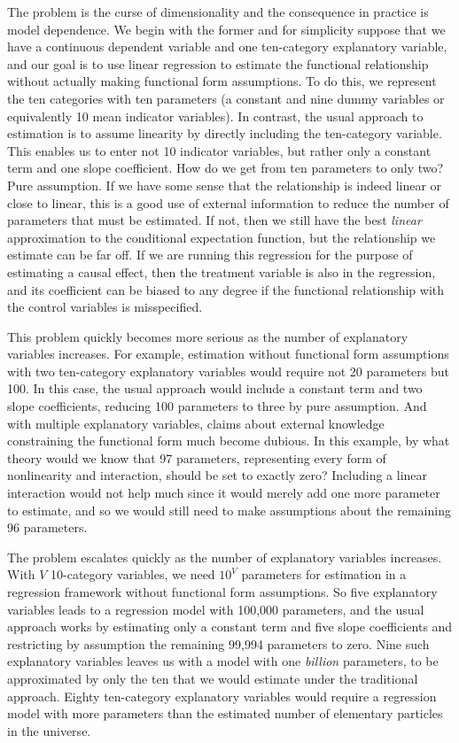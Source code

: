 \documentclass[11pt,titlepage]{article}
\begin{document}
The problem is the curse of dimensionality and the consequence in
practice is model dependence.  We begin with the former and for
simplicity suppose that we have a continuous dependent variable and
one ten-category explanatory variable, and our goal is to use linear
regression to estimate the functional relationship without actually
making functional form assumptions.  To do this, we represent the ten
categories with ten parameters (a constant and nine dummy variables or
equivalently 10 mean indicator variables).  In contrast, the usual
approach to estimation is to assume linearity by directly including
the ten-category variable.  This enables us to enter not 10 indicator
variables, but rather only a constant term and one slope coefficient.
How do we get from ten parameters to only two?  Pure assumption.  If
we have some sense that the relationship is indeed linear or close to
linear, this is a good use of external information to reduce the
number of parameters that must be estimated.  If not, then we still
have the best {\it linear} approximation to the conditional
expectation function, but the relationship we estimate can be far off.
If we are running this regression for the purpose of estimating a
causal effect, then the treatment variable is also in the regression,
and its coefficient can be biased to any degree if the functional
relationship with the control variables is misspecified.

This problem quickly becomes more serious as the number of explanatory
variables increases.  For example, estimation without functional form
assumptions with two ten-category explanatory variables would require
not 20 parameters but 100.  In this case, the usual approach would
include a constant term and two slope coefficients, reducing 100
parameters to three by pure assumption.  And with multiple explanatory
variables, claims about external knowledge constraining the functional
form much become dubious.  In this example, by what theory would we
know that 97 parameters, representing every form of nonlinearity and
interaction, should be set to exactly zero?  Including a linear
interaction would not help much since it would merely add one more
parameter to estimate, and so we would still need to make assumptions
about the remaining 96 parameters.

The problem escalates quickly as the number of explanatory variables
increases.  With $V$ 10-category variables, we need $10^V$ parameters
for estimation in a regression framework without functional form
assumptions.  So five explanatory variables leads to a regression
model with 100,000 parameters, and the usual approach works by
estimating only a constant term and five slope coefficients and
restricting by assumption the remaining 99,994 parameters to zero.
Nine such explanatory variables leaves us with a model with one
\emph{billion} parameters, to be approximated by only the ten that we
would estimate under the traditional approach.  Eighty ten-category
explanatory variables would require a regression model with more
parameters than the estimated number of elementary particles in the
universe.
\end{document}
